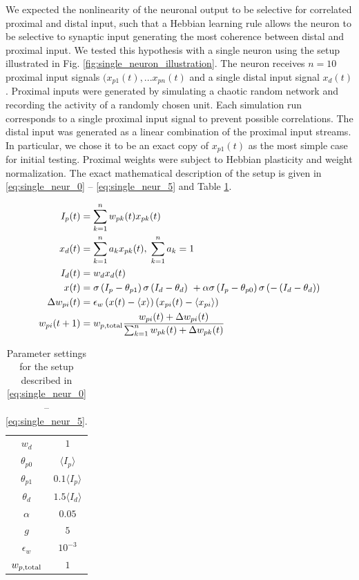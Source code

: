 \documentclass[10pt,a4paper]{article}
\begin{document}
We expected the nonlinearity of the neuronal output to be selective for correlated proximal and distal input, such that a Hebbian learning rule allows the neuron to be selective to synaptic input generating the most coherence between distal and proximal input. We tested this hypothesis with a single neuron using the setup illustrated in Fig. \ref{fig:single_neuron_illustration}. The neuron receives $n=10$ proximal input signals $(x_{p1}(t),...x_{pn}(t)$ and a single distal input signal $x_d (t)$. Proximal inputs were generated by simulating a chaotic random network and recording the activity of a randomly chosen unit. Each simulation run corresponds to a single proximal input signal to prevent possible correlations. The distal input was generated as a linear combination of the proximal input streams. In particular, we chose it to be an exact copy of $x_{p1}(t)$ as the most simple case for initial testing. Proximal weights were subject to Hebbian plasticity and weight normalization. The exact mathematical description of the setup is given in \eqref{eq:single_neur_0} -- \eqref{eq:single_neur_5} and Table \ref{tab:single_neuron_parameters}.

\begin{align}
I_p (t) &= \sum_{k=1}^n w_{pk} (t) x_{pk} (t) \label{eq:single_neur_0} \\
x_d (t) &= \sum_{k=1}^n a_k x_{pk} (t), \; \sum_{k=1}^n a_k = 1 \label{eq:single_neur_1} \\
I_d (t) &= w_d x_d (t) \label{eq:single_neur_2} \\
x(t) &= \sigma\left(I_p-\theta_{p1}\right) \sigma\left(I_d-\theta_d\right)\ +\alpha\sigma\left(I_p-\theta_{p0}\right)\sigma\left(-\left(I_d-\theta_d\right)\right) \label{eq:single_neur_3} \\
\Delta w_{pi} (t) &= \epsilon_w \left(x(t)-\langle x \rangle\right)\left(x_{pi}(t)-\langle x_{pi} \rangle \right) \label{eq:single_neur_4} \\
w_{pi}(t+1) &= w_{p,\rm total} \frac{w_{pi}(t) + \Delta w_{pi}(t)}{\sum_{k=1}^n w_{pk}(t) + \Delta w_{pk}(t)} \label{eq:single_neur_5}
\end{align}

\begin{table}
\centering
\caption{Parameter settings for the setup described in \eqref{eq:single_neur_0} -- \eqref{eq:single_neur_5}.}
\begin{tabular}{|c|c|}
\hline
$w_d$ & $1$ \\
$\theta_{p0}$ & $\langle I_p \rangle$ \\
$\theta_{p1}$ & $0.1\langle I_p \rangle$ \\
$\theta_{d}$ & $1.5\langle I_d \rangle$ \\
$\alpha$ & $0.05$ \\
$g$ & $5$ \\
$\epsilon_w$ & $10^{-3}$ \\
$w_{p,\rm total}$ & $1$ \\
\hline
\end{tabular}
\label{tab:single_neuron_parameters}
\end{table}
\end{document}
